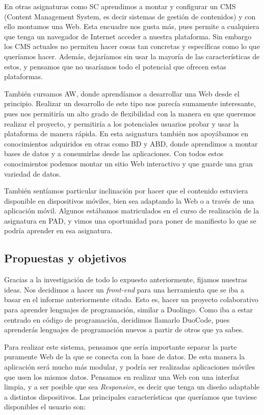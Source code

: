 En otras asignaturas como SC\cite{SC} aprendimos a montar y configurar un CMS (Content Management System, es decir sistemas de gestión de contenidos) y con ello montamos una Web. Esta encuadre nos gusta más, pues permite a cualquiera que tenga un navegador de Internet acceder a nuestra plataforma. Sin embargo los CMS actuales no permiten hacer cosas tan concretas y específicas como lo que queríamos hacer. Además, dejaríamos sin usar la mayoría de las características de estos, y pensamos que no usaríamos todo el potencial que ofrecen estas plataformas.

También cursamos AW\cite{AW}, donde aprendíamos a desarrollar una Web desde el principio. Realizar un desarrollo de este tipo nos parecía sumamente interesante, pues nos permitiría un alto grado de flexibilidad con la manera en que queremos realizar el proyecto, y permitiría a los potenciales usuarios probar y usar la plataforma de manera rápida. En esta asignatura también nos apoyábamos en conocimientos adquiridos en otras como BD\cite{BD} y ABD\cite{ABD}, donde aprendimos a montar bases de datos y a consumirlas desde las aplicaciones. Con todos estos conocimientos podemos montar un sitio Web interactivo y que guarde una gran variedad de datos. 

También sentíamos particular inclinación por hacer que el contenido estuviera disponible en dispositivos móviles, bien sea adaptando la Web o a través de una aplicación móvil. Algunos estábamos matriculados en el curso de realización de la asignatura en PAD\cite{PAD}, y vimos una oportunidad para poner de manifiesto lo que se podría aprender en esa asignatura.

\subsection{Propuestas y objetivos\label{subsec:introduction}}

Gracias a la investigación de todo lo expuesto anteriormente, fijamos nuestras ideas. Nos decidimos a hacer un \emph{front-end} para una herramienta que se iba a basar en el informe anteriormente citado\cite{pimcdDuoCode14}. Esto es, hacer un proyecto colaborativo para aprender lenguajes de programación, similar a Duolingo\cite{duolingo}. Como iba a estar centrado en código de programación, decidimos llamarlo DuoCode, pues aprenderás lenguajes de programación nuevos a partir de otros que ya sabes. 

Para realizar este sistema, pensamos que sería importante separar la parte puramente Web de la que se conecta con la base de datos. De esta manera la aplicación será mucho más modular, y podría ser realizadas aplicaciones móviles que usen los mismos datos. Pensamos en realizar una Web con una interfaz limpia, y a ser posible que sea \emph{Responsive}, es decir que tenga un diseño adaptable a distintos dispositivos. Las principales características que queríamos que tuviese disponibles el usuario son:

